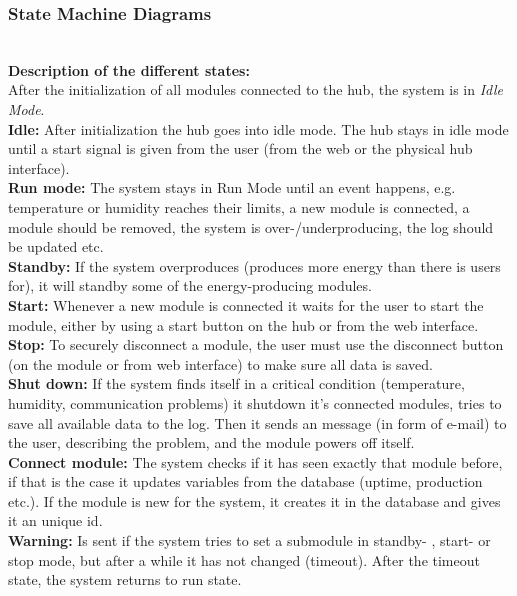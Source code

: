 			\subsubsection{State Machine Diagrams}
				\textbf{ }\\
				\textbf{Description of the different states: }
				\\ After the initialization of all modules connected to the hub, the system is in  \textit{Idle Mode}.
				\\\textbf{Idle: } After initialization the hub goes into idle mode. The hub stays in idle mode until a start signal is given from the user (from the web or the physical hub 							interface). 
				\\\textbf{Run mode: }The system stays in Run Mode until an event happens, e.g. temperature or humidity reaches their limits,
				a new module is connected, a module should be removed, the system is over-/underproducing, the log should be updated etc.
				\\\textbf{Standby: }If the system overproduces (produces more energy than there is users for), it will standby some of the energy-producing modules.
				\\\textbf{Start: }Whenever a new module is connected it waits for the user to start the module, either by using a start button on the hub or from the web interface.
				\\\textbf{Stop: }To securely disconnect a module, the user must use the disconnect button (on the module or from web interface) to make sure all data is saved.
				\\\textbf{Shut down: }If the system finds itself in a critical condition (temperature, humidity, communication problems) it shutdown it's connected modules,
							        tries to save all available data to the log. Then it sends an message (in form of e-mail) to the user, describing the problem, and the module
							        powers off itself. 
				\\\textbf{Connect module: } The system checks if it has seen exactly that module before, if that is the case it updates variables from the database
									(uptime, production etc.). If the module is new for the system, it creates it in the database and gives it an unique id.
				\\\textbf{Warning: }Is sent if the system tries to set a submodule in standby- , start- or stop mode, but after a while it has not changed (timeout). 
							    After the timeout state, the system returns to run state.
